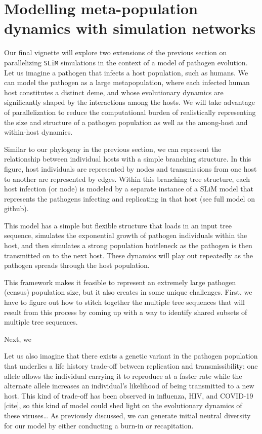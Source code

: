 \documentclass[12pt]{article}
\newcommand{\slim}[0]{\texttt{SLiM}\xspace}
\begin{document}
\section*{Modelling meta-population dynamics with simulation networks}

Our final vignette will explore two extensions of the previous section on parallelizing \slim simulations in the context of
a model of pathogen evolution.
Let us imagine a pathogen that infects a host population, such as humans. We can model the pathogen as
a large metapopulation, where each infected human host constitutes a distinct deme, and whose evolutionary
dynamics are significantly shaped by the interactions among the hosts. We will take advantage of parallelization
to reduce the computational burden of realistically representing the size and structure
of a pathogen population as well as the among-host and within-host dynamics.

Similar to our phylogeny in the previous section, we can represent the relationship between individual hosts
with a simple branching structure. In this figure, host individuals are represented by nodes and transmissions
from one host to another are represented by edges.
Within this branching tree structure, each host infection (or node) is modeled by a separate instance of a
SLiM model that represents the pathogens infecting and replicating in that host (see full model on github).


This model has a simple but flexible structure that loads in an input tree sequence, simulates the exponential growth of
pathogen individuals within the host, and then simulates a strong population bottleneck as the pathogen is then
transmitted on to the next host. These dynamics will play out repeatedly as the pathogen spreads through the host population.

This framework makes it feasible to represent an extremely large pathogen (census) population size, but it also
creates in some unique challenges. First, we have to figure out how to stitch together the multiple tree sequences
that will result from this process by coming up with a way to identify shared subsets of multiple tree sequences.

Next, we 




Let us also imagine that there exists a genetic variant in the pathogen population that underlies a life history trade-off between replication and transmissibility; one allele allows the individual carrying it to reproduce at a faster rate while the alternate allele increases an individual’s likelihood of being transmitted to a new host. This kind of trade-off has been observed in influenza, HIV, and COVID-19 [cite], so this kind of model could shed light on the evolutionary dynamics of these viruses…
As previously discussed, we can generate initial neutral diversity for our model by either conducting a burn-in or recapitation. 
\end{document}
